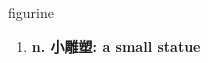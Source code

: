 
\begin{frame}
{\huge figurine}
\begin{center}
\begin{enumerate}\Large
  \item \textbf{n. 小雕塑: a small statue}
\end{enumerate}
\end{center}
\end{frame}
